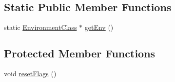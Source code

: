 \subsection*{Static Public Member Functions}
\begin{DoxyCompactItemize}
\item 
static \hyperlink{classEnvironment}{Environment\-Class} $\ast$ \hyperlink{classBaseObject_a9cac0fb45b656e017af6cce60631dd60}{get\-Env} ()
\end{DoxyCompactItemize}
\subsection*{Protected Member Functions}
\begin{DoxyCompactItemize}
\item 
void \hyperlink{classBaseObject_aea251de191ee251d4ad7d3613f562c0a}{reset\-Flags} ()
\end{DoxyCompactItemize}
